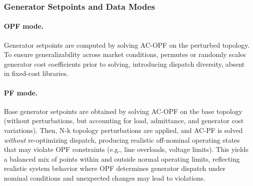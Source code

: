 \subsubsection{Generator Setpoints and Data Modes}
\label{subsubsec:gen_setpoints}

\paragraph{OPF mode.}
Generator setpoints are computed by solving AC-OPF on the perturbed topology. To ensure generalizability across market conditions, \datakit permutes or randomly scales generator cost coefficients prior to solving, introducing dispatch diversity, absent in fixed-cost libraries.

\paragraph{PF mode.}
Base generator setpoints are obtained by solving AC-OPF on the base topology (without perturbations, but accounting for load, admittance, and generator cost variations). Then, N-k topology perturbations are applied, and AC-PF is solved \textit{without} re-optimizing dispatch, producing realistic off-nominal operating states that may violate OPF constraints (e.g., line overloads, voltage limits). This yields a balanced mix of points within and outside normal operating limits, reflecting realistic system behavior where OPF determines generator dispatch under nominal conditions and unexpected changes may lead to violations.


